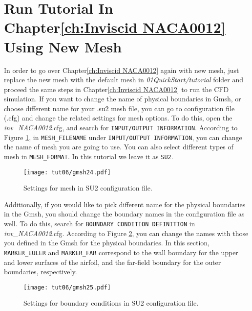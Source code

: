 \section{Run Tutorial In Chapter\ref{ch:Inviscid NACA0012} Using New Mesh}
In order to go over Chapter\ref{ch:Inviscid NACA0012} again with new mesh, just replace the new mesh with the default mesh in \textit{01QuickStart/tutorial} folder and proceed the same steps in Chapter\ref{ch:Inviscid NACA0012} to run the CFD simulation. If you want to change the name of physical boundaries in Gmsh, or choose different name for your .su2 mesh file, you can go to configuration file (.cfg) and change the related settings for mesh options. To do this, open the \textit{inv\_NACA0012}.cfg, and search for \texttt{INPUT/OUTPUT INFORMATION}. According to Figure \ref{fig6:gmsh24}, in \texttt{MESH\_FILENAME} under \texttt{INPUT/OUTPUT INFORMATION}, you can change the name of mesh you are going to use. You can also select different types of mesh in \texttt{MESH\_FORMAT}. In this tutorial we leave it as \texttt{SU2}.
\begin{figure}[htbp]
    \centering
    \texttt{[image: tut06/gmsh24.pdf]}
    \caption{Settings for mesh in SU2 configuration file.}
    \label{fig6:gmsh24}
\end{figure}
Additionally, if you would like to pick different name for the physical boundaries in the Gmsh, you should change the boundary names in the configuration file as well. To do this, search for \texttt{BOUNDARY CONDITION DEFINITION} in \textit{inv\_NACA0012}.cfg. According to Figure \ref{fig6:gmsh25}, you can change the names with those you defined in the Gmsh for the physical boundaries. In this section, \texttt{MARKER\_EULER} and \texttt{MARKER\_FAR} correspond to the wall boundary for the upper and lower surfaces of the airfoil, and the far-field boundary for the outer boundaries, respectively.
\begin{figure}[htbp]
    \centering
    \texttt{[image: tut06/gmsh25.pdf]}
    \caption{Settings for boundary conditions in SU2 configuration file.}
    \label{fig6:gmsh25}
\end{figure}

